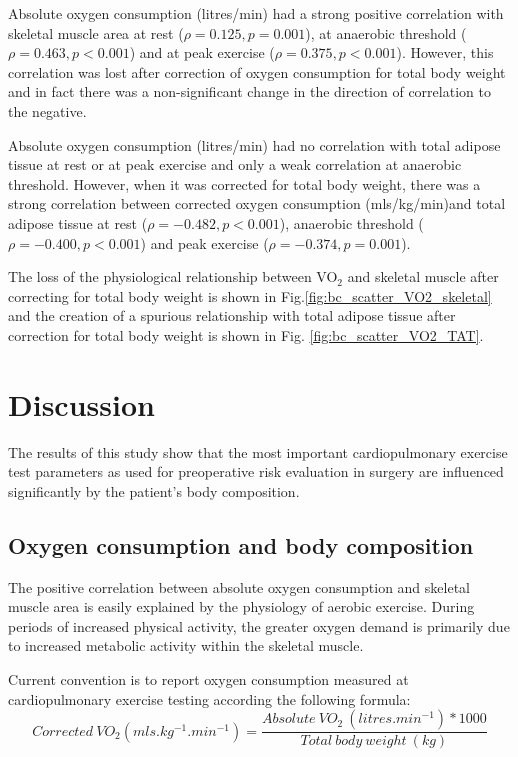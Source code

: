 Absolute oxygen consumption (litres/min) had a strong positive correlation with skeletal muscle area at rest ($\rho = 0.125, p = 0.001$), at anaerobic threshold ($\rho = 0.463, p<0.001$) and at peak exercise ($\rho = 0.375, p<0.001$). However, this correlation was lost after correction of oxygen consumption for total body weight and in fact there was a non-significant change in the direction of correlation to the negative.

Absolute oxygen consumption (litres/min) had no correlation with total adipose tissue at rest or at peak exercise and only a weak correlation at anaerobic threshold. However, when it was corrected for total body weight, there was a strong correlation between corrected oxygen consumption (mls/kg/min)and total adipose tissue at rest ($\rho = -0.482, p<0.001$), anaerobic threshold ($\rho = -0.400, p<0.001$) and peak exercise ($\rho = -0.374, p = 0.001$).

The loss of the physiological relationship between VO$_2$ and skeletal muscle after correcting for total body weight is shown in Fig.\ref{fig:bc_scatter_VO2_skeletal} and the creation of a spurious relationship with total adipose tissue after correction for total body weight is shown in Fig. \ref{fig:bc_scatter_VO2_TAT}.

\clearpage

\section{Discussion}

The results of this study show that the most important cardiopulmonary exercise test parameters as used for preoperative risk evaluation in surgery are influenced significantly by the patient's body composition. 

\subsection{Oxygen consumption and body composition}

The positive correlation between absolute oxygen consumption and skeletal muscle area is easily explained by the physiology of aerobic exercise. During periods of increased physical activity, the greater oxygen demand is primarily due to increased metabolic activity within the skeletal muscle. 

Current convention is to report oxygen consumption measured at cardiopulmonary exercise testing according the following formula: 
\[Corrected\ VO_2 (mls.kg^{-1}.min^{-1}) = \frac{Absolute\ VO_2\ (litres.min^{-1}) * 1000}{Total\ body\ weight\ (kg)}\]

